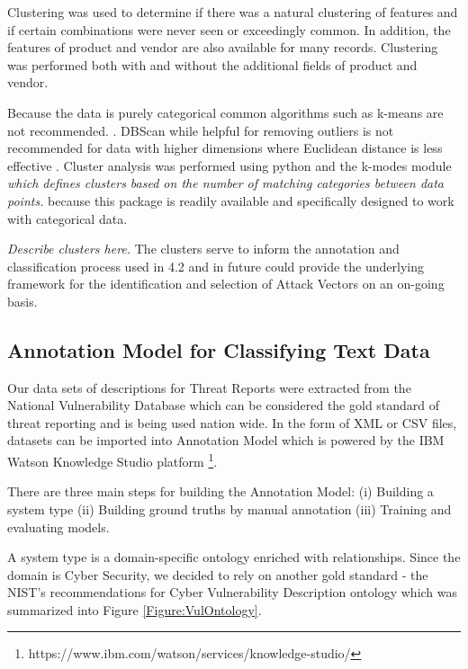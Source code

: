 \documentclass{article} %
\begin{document}
Clustering was used to determine if there was a natural clustering of features and if certain combinations were never seen or exceedingly common. In addition, the features of product and vendor are also available for many records.  Clustering was performed both with and without the additional fields of product and vendor.

Because the data is purely categorical common algorithms such as k-means are not recommended. \cite{}.  DBScan while helpful for removing outliers is not recommended for data with higher dimensions where Euclidean distance is less effective \cite{}.  
Cluster analysis was performed using python and the k-modes module \cite{https://pypi.org/project/kmodes/} \textit{which defines clusters based on the number of matching categories between data points.}   because this package is readily available and specifically designed to work with categorical data.  

\textit{Describe clusters here.
}
The clusters serve to inform the annotation and classification process used in 4.2 and in future could provide the underlying framework for the identification and selection of Attack Vectors on an on-going basis.



\subsection{Annotation Model for Classifying Text Data}
Our data sets of descriptions for Threat Reports were extracted from the National Vulnerability Database which can be considered the gold standard of threat reporting and is being used nation wide. In the form of XML or CSV files, datasets can be imported into Annotation Model which is powered by the IBM Watson Knowledge Studio platform \footnote{https://www.ibm.com/watson/services/knowledge-studio/}.

There are three main steps for building the Annotation Model: (i) Building a system type (ii) Building ground truths by manual annotation (iii) Training and evaluating models.

A system type is a domain-specific ontology enriched with relationships. Since the domain is Cyber Security, we decided to rely on another gold standard - the NIST's recommendations for Cyber Vulnerability Description ontology \cite{Booth2016DraftOntology} which was summarized into Figure \ref{Figure:VulOntology}.
\end{document}

